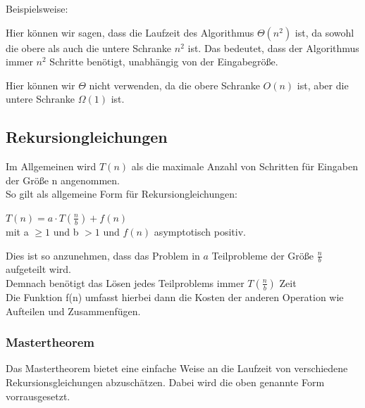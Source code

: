 \documentclass[
../AuD-Zusammenfassung.tex,
]
{subfiles}
\begin{document}
Beispielsweise:

\begin{algorithm}[H]
\end{algorithm}

Hier können wir sagen, dass die Laufzeit des Algorithmus $\Theta(n^2)$ ist, da sowohl die obere als auch die untere Schranke $n^2$ ist. Das bedeutet, dass der Algorithmus immer $n^2$ Schritte benötigt, unabhängig von der Eingabegröße.

\begin{algorithm}[H]
\end{algorithm}

Hier können wir $\Theta$ nicht verwenden, da die obere Schranke $O(n)$ ist, aber die untere Schranke $\Omega(1)$ ist. 

\newpage
\subsection{Rekursiongleichungen}
Im Allgemeinen wird $T(n)$ als die maximale Anzahl von Schritten für Eingaben der Größe n angenommen. \\
So gilt als allgemeine Form für Rekursiongleichungen: 
\begin{center}
    $T(n) = a\cdot T(\frac{n}{b}) + f(n)$\\
    mit a $\geq 1$ und b $> 1$ und $f(n)$ asymptotisch positiv.
\end{center}
Dies ist so anzunehmen, dass das Problem in $a$ Teilprobleme der Größe $\frac{n}{b}$ aufgeteilt wird.\\
Demnach benötigt das Lösen jedes Teilproblems immer $T(\frac{n}{b})$ Zeit\\
Die Funktion f(n) umfasst hierbei dann die Kosten der anderen Operation wie Aufteilen und Zusammenfügen.
\subsubsection{Mastertheorem}
Das Mastertheorem bietet eine einfache Weise an die Laufzeit von verschiedene Rekursionsgleichungen abzuschätzen. Dabei wird die oben genannte Form vorrausgesetzt. \\
\end{document}
